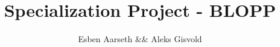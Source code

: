 \documentclass{report}
\begin{document}
\title{Specialization Project - BLOPP}

\author{Esben Aarseth && Aleks Gisvold}





\end{document}
